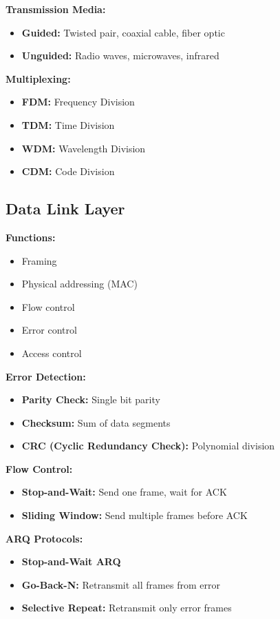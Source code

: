 \documentclass[11pt,a4paper]{article}
\begin{document}
\textbf{Transmission Media:}
\begin{itemize}
    \item \textbf{Guided:} Twisted pair, coaxial cable, fiber optic
    \item \textbf{Unguided:} Radio waves, microwaves, infrared
\end{itemize}

\textbf{Multiplexing:}
\begin{itemize}
    \item \textbf{FDM:} Frequency Division
    \item \textbf{TDM:} Time Division
    \item \textbf{WDM:} Wavelength Division
    \item \textbf{CDM:} Code Division
\end{itemize}

\subsection{Data Link Layer}

\textbf{Functions:}
\begin{itemize}
    \item Framing
    \item Physical addressing (MAC)
    \item Flow control
    \item Error control
    \item Access control
\end{itemize}

\textbf{Error Detection:}
\begin{itemize}
    \item \textbf{Parity Check:} Single bit parity
    \item \textbf{Checksum:} Sum of data segments
    \item \textbf{CRC (Cyclic Redundancy Check):} Polynomial division
\end{itemize}

\textbf{Flow Control:}
\begin{itemize}
    \item \textbf{Stop-and-Wait:} Send one frame, wait for ACK
    \item \textbf{Sliding Window:} Send multiple frames before ACK
\end{itemize}

\textbf{ARQ Protocols:}
\begin{itemize}
    \item \textbf{Stop-and-Wait ARQ}
    \item \textbf{Go-Back-N:} Retransmit all frames from error
    \item \textbf{Selective Repeat:} Retransmit only error frames
\end{itemize}
\end{document}
